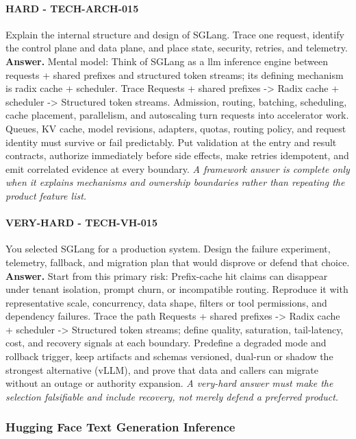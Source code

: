 \paragraph{HARD - TECH-ARCH-015} Explain the internal structure and design of SGLang. Trace one request, identify the control plane and data plane, and place state, security, retries, and telemetry.
\textbf{Answer.} Mental model: Think of SGLang as a llm inference engine between requests + shared prefixes and structured token streams; its defining mechanism is radix cache + scheduler. Trace Requests + shared prefixes -> Radix cache + scheduler -> Structured token streams. Admission, routing, batching, scheduling, cache placement, parallelism, and autoscaling turn requests into accelerator work. Queues, KV cache, model revisions, adapters, quotas, routing policy, and request identity must survive or fail predictably. Put validation at the entry and result contracts, authorize immediately before side effects, make retries idempotent, and emit correlated evidence at every boundary.
\textit{A framework answer is complete only when it explains mechanisms and ownership boundaries rather than repeating the product feature list.}
\paragraph{VERY-HARD - TECH-VH-015} You selected SGLang for a production system. Design the failure experiment, telemetry, fallback, and migration plan that would disprove or defend that choice.
\textbf{Answer.} Start from this primary risk: Prefix-cache hit claims can disappear under tenant isolation, prompt churn, or incompatible routing. Reproduce it with representative scale, concurrency, data shape, filters or tool permissions, and dependency failures. Trace the path Requests + shared prefixes -> Radix cache + scheduler -> Structured token streams; define quality, saturation, tail-latency, cost, and recovery signals at each boundary. Predefine a degraded mode and rollback trigger, keep artifacts and schemas versioned, dual-run or shadow the strongest alternative (vLLM), and prove that data and callers can migrate without an outage or authority expansion.
\textit{A very-hard answer must make the selection falsifiable and include recovery, not merely defend a preferred product.}
\subsubsection*{Hugging Face Text Generation Inference}
